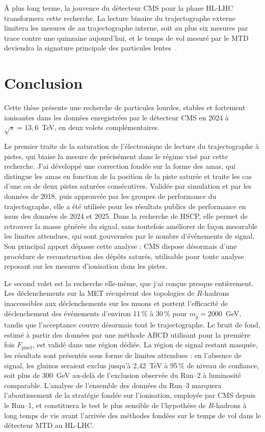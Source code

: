 À plus long terme, la jouvence du détecteur CMS pour la phase HL-LHC transformera cette recherche. La lecture binaire du trajectographe externe limitera les mesures de \dedx{} au trajectographe interne, soit au plus six mesures par trace contre une quinzaine aujourd'hui, et le temps de vol mesuré par le MTD deviendra la signature principale des particules lentes~\cite{CMS-DP-2022-025}.


\section*{Conclusion}
\label{sec:resume:conclusion}

Cette thèse présente une recherche de particules lourdes, stables et fortement ionisantes dans les données enregistrées par le détecteur CMS en 2024 à $\sqrt{s}=13{,}6$~TeV, en deux volets complémentaires.

Le premier traite de la saturation de l'électronique de lecture du trajectographe à pistes, qui biaise la mesure de \dedx{} précisément dans le régime visé par cette recherche. J'ai développé une correction fondée sur la forme des amas, qui distingue les amas en fonction de la position de la piste saturée et traite les cas d'une ou de deux pistes saturées consécutives. Validée par simulation et par les données de 2018, puis approuvée par les groupes de performance du trajectographe, elle a été utilisée pour les résultats publics de performance en \dedx{} issus des données de 2024 et 2025. Dans la recherche de HSCP, elle permet de retrouver la masse générée du signal, sans toutefois améliorer de façon mesurable les limites attendues, qui sont gouvernées par le nombre d'événements de signal. Son principal apport dépasse cette analyse : CMS dispose désormais d'une procédure de reconstruction des dépôts saturés, utilisable pour toute analyse reposant sur les mesures d'ionisation dans les pistes.

Le second volet est la recherche elle-même, que j'ai conçue presque entièrement. Les déclenchements sur la MET récupèrent des topologies de $R$-hadrons inaccessibles aux déclenchements sur les muons et portent l'efficacité de déclenchement des événements d'environ 11\,\% à 30\,\% pour $m_{\tilde{g}}=2000$~GeV, tandis que l'acceptance couvre désormais tout le trajectographe. Le bruit de fond, estimé à partir des données par une méthode ABCD utilisant pour la première fois $F_\mathrm{pixel}$, est validé dans une région dédiée. La région de signal restant masquée, les résultats sont présentés sous forme de limites attendues : en l'absence de signal, les gluinos seraient exclus jusqu'à 2,42~TeV à 95\,\% de niveau de confiance, soit plus de 300~GeV au-delà de l'exclusion observée du Run--2 à luminosité comparable. L'analyse de l'ensemble des données du Run--3 marquera l'aboutissement de la stratégie fondée sur l'ionisation, employée par CMS depuis le Run--1, et constituera le test le plus sensible de l'hypothèse de $R$-hadrons à long temps de vie avant l'arrivée des méthodes fondées sur le temps de vol dans le détecteur MTD au HL-LHC.

